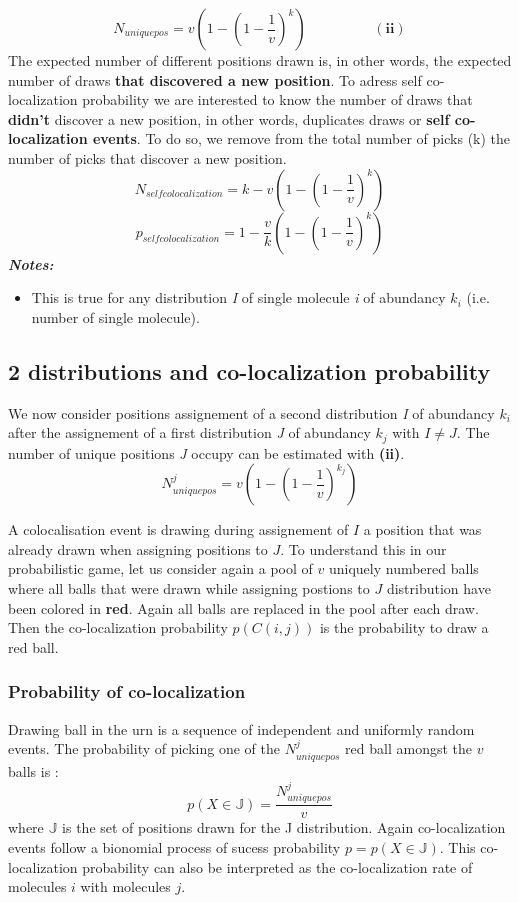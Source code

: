 \documentclass{article}
\begin{document}
\[\label{ii}
    N_{uniquepos} = v(1-(1-\frac{1}{v})^k) \hspace{2cm} (\textbf{ii})
\]
The expected number of different positions drawn is, in other words, the expected number of draws \textbf{that discovered a new position}.
To adress self co-localization probability we are interested to know the number of draws that \textbf{didn't} discover a new position,
in other words, duplicates draws or \textbf{self co-localization events}. To do so, we remove from the total number of picks (k) the
number of picks that discover a new position.
\[
N_{self colocalization} = k - v(1-(1-\frac{1}{v})^k)
\]
\[
p_{self colocalization} = 1 - \frac{v}{k}(1-(1-\frac{1}{v})^k)
\]
\textit{\textbf{Notes:}}
\begin{itemize}
    \item This is true for any distribution \textit{I} of single molecule \textit{i} of abundancy $ k_i $ (i.e. number of single molecule).
\end{itemize}




\newpage
\subsection{2 distributions and co-localization probability}
We now consider positions assignement of a second distribution \textit{I} of abundancy $ k_i $ after the assignement of a first 
distribution \textit{J} of abundancy $ k_j $ with $ I \neq J $. The number of unique positions \textit{J} occupy can be estimated with
\textbf{(ii)}.
\[
N^j_{uniquepos} = v(1-(1-\frac{1}{v})^{k_j})
\]

A colocalisation event is drawing during assignement of $I$ a position that was already drawn when assigning positions to $J$. To
understand this in our probabilistic game, let us consider again a pool of $v$ uniquely numbered balls where all balls that were 
drawn while assigning postions to $J$ distribution have been colored in \textbf{red}. Again all balls are replaced in the pool after
each draw. Then the co-localization probability $p(C(i,j))$ is the
probability to draw a red ball.

\subsubsection{Probability of co-localization}
Drawing ball in the urn is a sequence of independent and uniformly random events. The probability of picking one of the $N^j_{uniquepos}$ red ball amongst the $v$
balls is :
\[
p(X\in \mathbb{J}) = \frac{N^j_{uniquepos}}{v}
\] 
where $\mathbb{J}$  is the set of positions drawn for the J distribution.
Again co-localization events follow a bionomial process of sucess probability $p = p(X\in \mathbb{J})$. This co-localization probability
can also be interpreted as the co-localization rate of molecules $i$ with molecules $j$.
\end{document}
